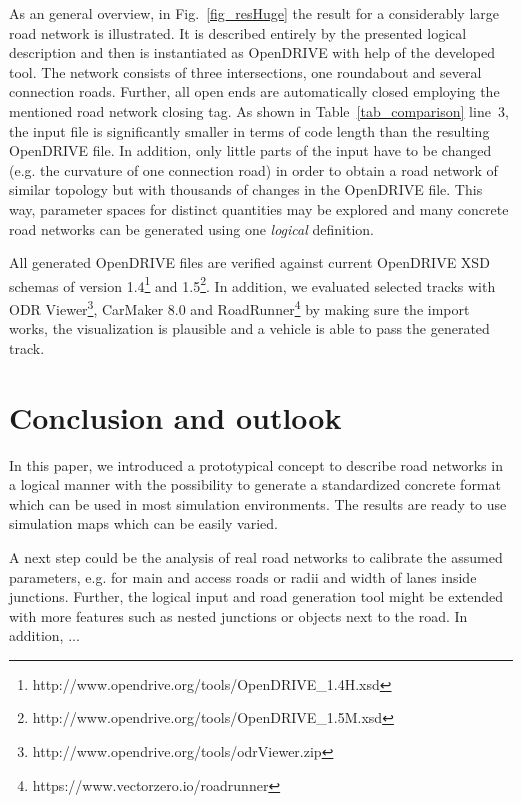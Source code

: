 \documentclass[a4paper, 10pt, conference]{ieeeconf}      %
\begin{document}
As an general overview, in Fig.~\ref{fig_resHuge} the result for a considerably large road network is illustrated. It is described entirely by the presented logical description and then is instantiated as OpenDRIVE with help of the developed tool. The network consists of three intersections, one roundabout and several connection roads. Further, all open ends are automatically closed employing the mentioned road network closing tag. As shown in Table~\ref{tab_comparison} line~3, the input file is significantly smaller in terms of code length than the resulting OpenDRIVE file. In addition, only little parts of the input have to be changed (e.g. the curvature of one connection road) in order to obtain a road network of similar topology but with thousands of changes in the OpenDRIVE file. This way, parameter spaces for distinct quantities may be explored and many concrete road networks can be generated using one \emph{logical} definition.

All generated OpenDRIVE files are verified against current OpenDRIVE XSD schemas of version 1.4\footnote{http://www.opendrive.org/tools/OpenDRIVE\_1.4H.xsd} and 1.5\footnote{http://www.opendrive.org/tools/OpenDRIVE\_1.5M.xsd}. In addition, we evaluated selected tracks with ODR Viewer\footnote{http://www.opendrive.org/tools/odrViewer.zip}, CarMaker 8.0 and RoadRunner\footnote{https://www.vectorzero.io/roadrunner} by making sure the import works, the visualization is plausible and a vehicle is able to pass the generated track.

\section{Conclusion and outlook} %
In this paper, we introduced a prototypical concept to describe road networks in a logical manner with the possibility to generate a standardized concrete format which can be used in most simulation environments.
The results are ready to use simulation maps which can be easily varied.

A next step could be the analysis of real road networks to calibrate the assumed parameters, e.g. for main and access roads or radii and width of lanes inside junctions.
Further, the logical input and road generation tool might be extended with more features such as nested junctions or objects next to the road.
In addition, ...
\end{document}
